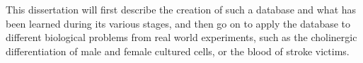 This dissertation will first describe the creation of such a database and what has been learned during its various stages, and then go on to apply the database to different biological problems from real world experiments, such as the cholinergic differentiation of male and female cultured cells, or the blood of stroke victims.
